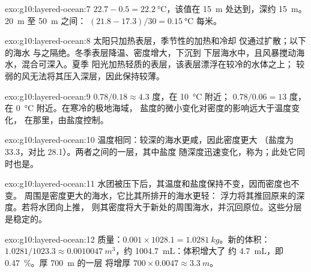 \begin{solution}{exo:g10:layered-ocean:7}
$22.7 - 0.5 = \qty{22.2}{\degreeCelsius}$，该值在 \qty{15}{m} 处达到，深约 \qty{15}{m}。\qty{20}{m} 至 \qty{50}{m} 之间：
$(21.8 - 17.3)/30 = \qty{0.15}{\degreeCelsius}$ 每米。
\end{solution}

\begin{solution}{exo:g10:layered-ocean:8}
太阳只加热表层，季节性的加热和冷却
仅通过扩散；以下的海水
与之隔绝。冬季表层降温、密度增大，下沉到
下层海水中，且风暴搅动海水，混合可深入。夏季
阳光加热轻质的表层，该表层漂浮在较冷的水体之上；
较弱的风无法将其压入深层，因此保持较薄。
\end{solution}

\begin{solution}{exo:g10:layered-ocean:9}
$0.78/0.18 \approx 4.3$ 度，在 \qty{10}{\degreeCelsius} 附近；
$0.78/0.06 = 13$ 度，在 \qty{0}{\degreeCelsius} 附近。在寒冷的极地海域，
盐度的微小变化对密度的影响远大于温度变化，
在那里，由盐度控制。
\end{solution}

\begin{solution}{exo:g10:layered-ocean:10}
温度相同：较深的海水更咸，因此密度更大
（盐度为 33.3，对比 28.1）。两者之间的一层，其中盐度
随深度迅速变化，称为；此处它同时也是。
\end{solution}

\begin{solution}{exo:g10:layered-ocean:11}
水团被压下后，其温度和盐度保持不变，因而密度也不变。
周围是密度更大的海水，它比其所排开的海水更轻：
浮力将其推回原来的深度。若将水团向上推，
则其密度将大于新处的周围海水，并沉回原位。这些分层是稳定的。
\end{solution}

\begin{solution}{exo:g10:layered-ocean:12}
质量：$0.001 \times 1028.1 = \qty{1.0281}{kg}$。新的体积：$1.0281/1023.3
\approx \qty{0.0010047}{m^3}$，约 \qty{1004.7}{mL}：体积增大了
约 \qty{4.7}{mL}，即 \qty{0.47}{\percent}。厚 \qty{700}{m} 的一层
将增厚 $700 \times 0.0047 \approx \qty{3.3}{m}$。
\end{solution}

